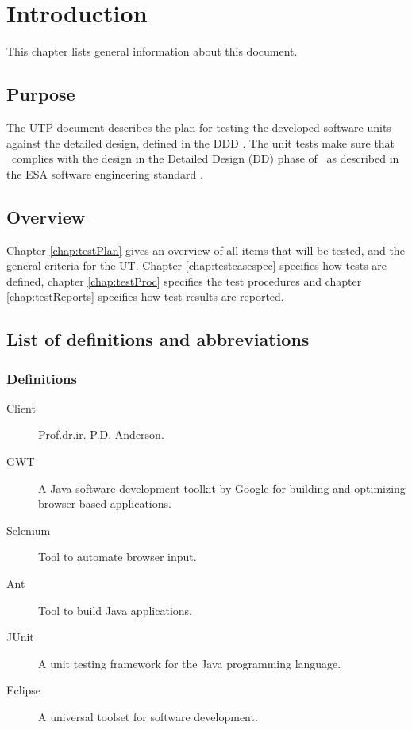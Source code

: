 \chapter{Introduction}\label{chap:intro}
This chapter lists general information about this document.

\section{Purpose}
The UTP document describes the plan for testing the developed software units against the
detailed design, defined in the DDD \cite{DDD}. The unit tests make sure that \projectname\ complies
with the design in the Detailed Design (DD) phase of \projectname\ as described in
the ESA software engineering standard \cite{esa}.

\section{Overview}
\label{sec:overview}

Chapter \ref{chap:testPlan} gives an overview of all items that will be tested, and the general criteria for the UT.
Chapter \ref{chap:testcasespec} speciﬁes how tests are defined, chapter \ref{chap:testProc} specifies the test procedures and chapter \ref{chap:testReports} speciﬁes how test results are reported.


\section{List of definitions and abbreviations}
\label{sec:listofdef}


\subsection{Definitions}
\label{subsec:def}

\begin{description}
\item[Client] Prof.dr.ir. P.D. Anderson.
\item[GWT] A Java software development toolkit by Google for building and optimizing browser-based applications.
\item[Selenium] Tool to automate browser input.
\item[Ant] Tool to build Java applications.
\item[JUnit] A unit testing framework for the Java programming language.
\item[Eclipse] A universal toolset for software development.
\end{description}

